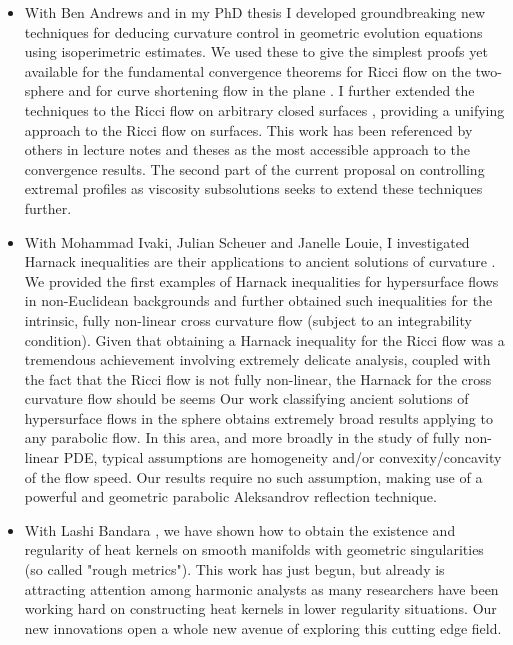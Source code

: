 \documentclass[12pt]{article}
\begin{document}
\begin{itemize}
\item With Ben Andrews and in my PhD thesis I developed groundbreaking new techniques for deducing curvature control in geometric evolution equations using isoperimetric estimates. We used these to give the simplest proofs yet available for the fundamental convergence theorems for Ricci flow on the two-sphere \cite{MR2729306} and for curve shortening flow in the plane \cite{MR2794630,MR2843240}. I further extended the techniques to the Ricci flow on arbitrary closed surfaces \cite{Bryan}, providing a unifying approach to the Ricci flow on surfaces. This work has been referenced by others in lecture notes and theses as the most accessible approach to the convergence results. The second part of the current proposal on controlling extremal profiles as viscosity subsolutions seeks to extend these techniques further.

\item With Mohammad Ivaki, Julian Scheuer and Janelle Louie, I investigated Harnack inequalities are their applications to ancient solutions of curvature \cite{2017arXiv170307493B,bryanlouie,2016arXiv160401694B,2015arXiv150802821B,2015arXiv151203374B}. We provided the first examples of Harnack inequalities for hypersurface flows in non-Euclidean backgrounds and further obtained such inequalities for the intrinsic, fully non-linear cross curvature flow (subject to an integrability condition). Given that obtaining a Harnack inequality for the Ricci flow was a tremendous achievement involving extremely delicate analysis, coupled with the fact that the Ricci flow is not fully non-linear, the Harnack for the cross curvature flow should be seems Our work classifying ancient solutions of hypersurface flows in the sphere obtains extremely broad results applying to any parabolic flow. In this area, and more broadly in the study of fully non-linear PDE, typical assumptions are homogeneity and/or convexity/concavity of the flow speed. Our results require no such assumption, making use of a powerful and geometric parabolic Aleksandrov reflection technique.

\item With Lashi Bandara \cite{2017arXiv171209287B}, we have shown how to obtain the existence and regularity of heat kernels on smooth manifolds with geometric singularities (so called "rough metrics"). This work has just begun, but already is attracting attention among harmonic analysts as many researchers have been working hard on constructing heat kernels in lower regularity situations. Our new innovations open a whole new avenue of exploring this cutting edge field.
\end{itemize}
\end{document}
